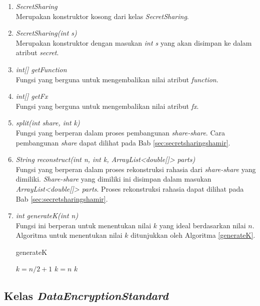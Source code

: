 \begin{enumerate}
	\item \textit{SecretSharing} \\
	Merupakan konstruktor kosong dari kelas \textit{SecretSharing}.
	\item \textit{SecretSharing(int s)} \\
	Merupakan konstruktor dengan masukan \textit{int s} yang akan disimpan ke dalam atribut \textit{secret}.
	\item \textit{int[] getFunction} \\
	Fungsi yang berguna untuk mengembalikan nilai atribut \textit{function}.
	\item \textit{int[] getFx} \\
	Fungsi yang berguna untuk mengembalikan nilai atribut \textit{fx}.
	\item \textit{split(int share, int k)} \\
	Fungsi yang berperan dalam proses pembangunan \textit{share-share}. Cara pembangunan \textit{share} dapat dilihat pada Bab \ref{sec:secretsharingshamir}.
	\item \textit{String reconstruct(int n, int k, ArrayList<double[]> parts)} \\
	Fungsi yang berperan dalam proses rekonstruksi rahasia dari \textit{share-share} yang dimiliki. \textit{Share-share} yang dimiliki ini disimpan dalam masukan \textit{ArrayList<double[]> parts}. Proses rekonstruksi rahasia dapat dilihat pada Bab \ref{sec:secretsharingshamir}.
	\item \textit{int generateK(int n)} \\
	Fungsi ini berperan untuk menentukan nilai $k$ yang ideal berdasarkan nilai $n$. Algoritma untuk menentukan nilai $k$ ditunjukkan oleh Algoritma \ref{generateK}.
	\begin{algorithm}[H]
		\caption{generateK}
		\label{generateK}
		\begin{algorithmic}[1]
				\State $k = n/2 + 1$
					\State $k = n$
				\EndIf
				\State \Return \begin{math}k\end{math}
			\EndFunction
		\end{algorithmic}
	\end{algorithm}
\end{enumerate}

\subsection{Kelas \textit{DataEncryptionStandard}}

